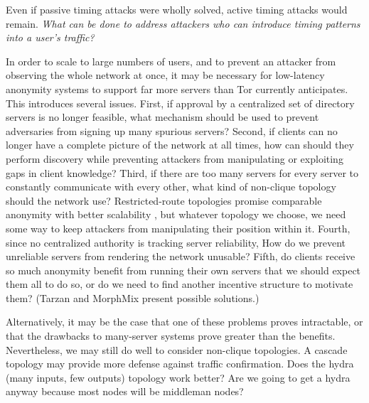 \documentclass[times,10pt,twocolumn]{article}
\begin{document}
Even if passive timing attacks were wholly solved, active timing
attacks would remain.  \emph{What can
  be done to address attackers who can introduce timing patterns into
  a user's traffic?}  %

%

In order to scale to large numbers of users, and to prevent an
attacker from observing the whole network at once, it may be necessary
for low-latency anonymity systems to support far more servers than Tor
currently anticipates.  This introduces several issues.  First, if
approval by a centralized set of directory servers is no longer
feasible, what mechanism should be used to prevent adversaries from
signing up many spurious servers? 
Second, if clients can no longer have a complete
picture of the network at all times, how can should they perform
discovery while preventing attackers from manipulating or exploiting
gaps in client knowledge?  Third, if there are too many servers
for every server to constantly communicate with every other, what kind
of non-clique topology should the network use?   Restricted-route
topologies promise comparable anonymity with better scalability
\cite{danezis-pets03}, but whatever topology we choose, we need some
way to keep attackers from manipulating their position within it.
Fourth, since no centralized authority is tracking server reliability,
How do we prevent unreliable servers from rendering the network
unusable?  Fifth, do clients receive so much anonymity benefit from
running their own servers that we should expect them all to do so, or
do we need to find another incentive structure to motivate them?
(Tarzan and MorphMix present possible solutions.)


Alternatively, it may be the case that one of these problems proves
intractable, or that the drawbacks to many-server systems prove
greater than the benefits.  Nevertheless, we may still do well to
consider non-clique topologies.  A cascade topology may provide more
defense against traffic confirmation.
Does the hydra (many inputs, few outputs) topology work
better? Are we going to get a hydra anyway because most nodes will be
middleman nodes?
\end{document}
